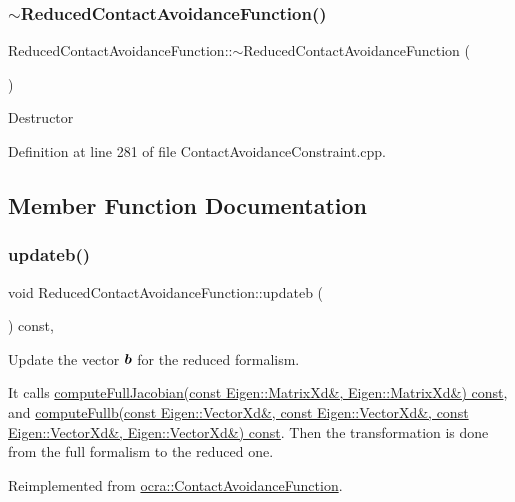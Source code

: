 \subsubsection{\texorpdfstring{$\sim$\+Reduced\+Contact\+Avoidance\+Function()}{~ReducedContactAvoidanceFunction()}}
{\footnotesize\ttfamily Reduced\+Contact\+Avoidance\+Function\+::$\sim$\+Reduced\+Contact\+Avoidance\+Function (\begin{DoxyParamCaption}{ }\end{DoxyParamCaption})}

Destructor 

Definition at line 281 of file Contact\+Avoidance\+Constraint.\+cpp.



\subsection{Member Function Documentation}
\hypertarget{classocra_1_1ReducedContactAvoidanceFunction_ac39227a19a650de28f4ae603511bfb73}{}\label{classocra_1_1ReducedContactAvoidanceFunction_ac39227a19a650de28f4ae603511bfb73} 
\subsubsection{\texorpdfstring{updateb()}{updateb()}}
{\footnotesize\ttfamily void Reduced\+Contact\+Avoidance\+Function\+::updateb (\begin{DoxyParamCaption}{ }\end{DoxyParamCaption}) const\hspace{0.3cm}{\ttfamily [protected]}, {\ttfamily [virtual]}}

Update the vector $ \mbox{\boldmath${b}$} $ for the reduced formalism.

It calls \hyperlink{classocra_1_1ContactAvoidanceFunction_a59994d2c3f364575ecff7fb23b7e10ab}{compute\+Full\+Jacobian(const Eigen\+::\+Matrix\+Xd\&, Eigen\+::\+Matrix\+Xd\&) const}, and \hyperlink{classocra_1_1ContactAvoidanceFunction_a9afd02871f0d26321b526290f565d541}{compute\+Fullb(const Eigen\+::\+Vector\+Xd\&, const Eigen\+::\+Vector\+Xd\&, const Eigen\+::\+Vector\+Xd\&, Eigen\+::\+Vector\+Xd\&) const}. Then the transformation is done from the full formalism to the reduced one. 

Reimplemented from \hyperlink{classocra_1_1ContactAvoidanceFunction_aed2f145f17ff9fd8dd646018376ea7e9}{ocra\+::\+Contact\+Avoidance\+Function}.



